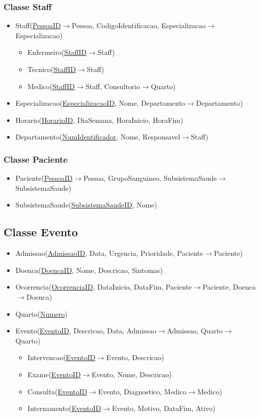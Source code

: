 \documentclass[article, a4paper, 12pt, oneside]{memoir}
\begin{document}
\subsubsection{Classe Staff}
\begin{itemize}
	\item Staff(\underline{PessoaID}$\rightarrow$Pessoa, CodigoIdentificacao, Especializacao$\rightarrow$Especializacao)
	\begin{itemize}
		\item Enfermeiro(\underline{StaffID}$\rightarrow$Staff)
		\item Tecnico(\underline{StaffID}$\rightarrow$Staff)
		\item Medico(\underline{StaffID}$\rightarrow$Staff, Consultorio$\rightarrow$Quarto)
	\end{itemize}
	\item Especializacao(\underline{EspecializacaoID}, Nome, Departamento$\rightarrow$Departamento)
	\item Horario(\underline{HorarioID}, DiaSemana, HoraInicio, HoraFim)
	\item Departamento(\underline{NumIdentificador}, Nome, Responsavel$\rightarrow$Staff)
\end{itemize}
\subsubsection{Classe Paciente}
\begin{itemize}
	\item Paciente(\underline{PessoaID}$\rightarrow$Pessoa, GrupoSanguineo, SubsistemaSaude$\rightarrow$SubsistemaSaude)
	\item SubsistemaSaude(\underline{SubsistemaSaudeID}, Nome)
\end{itemize}
\subsection{Classe Evento}
\begin{itemize}
	\item Admissao(\underline{AdmissaoID}, Data, Urgencia, Prioridade, Paciente$\rightarrow$Paciente)
	\item Doenca(\underline{DoencaID}, Nome, Descricao, Sintomas)
	\item Ocorrencia(\underline{OcorrenciaID}, DataInicio, DataFim, Paciente$\rightarrow$Paciente, Doenca$\rightarrow$Doenca)
	\item Quarto(\underline{Numero})
	\item Evento(\underline{EventoID}, Descricao, Data, Admissao$\rightarrow$Admissao, Quarto$\rightarrow$Quarto)
	\begin{itemize}
		\item Intervencao(\underline{EventoID}$\rightarrow$Evento, Descricao)
		\item Exame(\underline{EventoID}$\rightarrow$Evento, Nome, Descricao)
		\item Consulta(\underline{EventoID}$\rightarrow$Evento, Diagnostico, Medico$\rightarrow$Medico)
		\item Internamento(\underline{EventoID}$\rightarrow$Evento, Motivo, DataFim, Ativo)
	\end{itemize}
\end{itemize}
\end{document}
